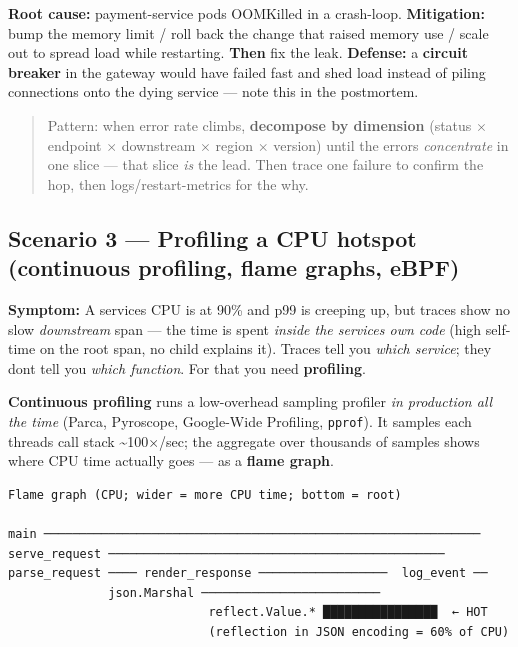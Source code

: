 \documentclass[11pt]{article}
\begin{document}
\textbf{Root cause:} payment-service pods OOMKilled in a crash-loop. \textbf{Mitigation:} bump the memory limit / roll back the change that raised memory use / scale out to spread load while restarting. \textbf{Then} fix the leak. \textbf{Defense:} a \textbf{circuit breaker} in the gateway would have failed fast and shed load instead of piling connections onto the dying service --- note this in the postmortem.

\begin{quote}
Pattern: when error rate climbs, \textbf{decompose by dimension} (status \(\times\) endpoint \(\times\) downstream \(\times\) region \(\times\) version) until the errors \emph{concentrate} in one slice --- that slice \emph{is} the lead. Then trace one failure to confirm the hop, then logs/restart-metrics for the why.
\end{quote}

\subsection{Scenario 3 --- Profiling a CPU hotspot (continuous profiling, flame graphs, eBPF)}\label{scenario-3--profiling-a-cpu-hotspot-continuous-profiling-flame-graphs-ebpf}

\textbf{Symptom:} A service\textquotesingle s CPU is at 90\% and p99 is creeping up, but traces show no slow \emph{downstream} span --- the time is spent \emph{inside the service\textquotesingle s own code} (high self-time on the root span, no child explains it). Traces tell you \emph{which service}; they don\textquotesingle t tell you \emph{which function}. For that you need \textbf{profiling}.

\textbf{Continuous profiling} runs a low-overhead sampling profiler \emph{in production all the time} (Parca, Pyroscope, Google-Wide Profiling, \texttt{pprof}). It samples each thread\textquotesingle s call stack \textasciitilde100\(\times\)/sec; the aggregate over thousands of samples shows where CPU time actually goes --- as a \textbf{flame graph}.

\setcodelang{}

\begin{verbatim}
Flame graph (CPU; wider = more CPU time; bottom = root)

main ─────────────────────────────────────────────────────────────
serve_request ───────────────────────────────────────────────
parse_request ──── render_response ──────────────────  log_event ──
              json.Marshal ─────────────────────────
                            reflect.Value.* ████████████████  ← HOT
                            (reflection in JSON encoding = 60% of CPU)
\end{verbatim}
\end{document}
